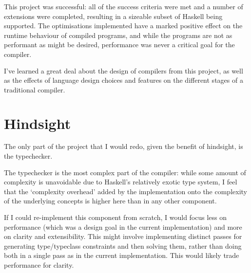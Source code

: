\documentclass[dissertation.tex]{subfiles}
\begin{document}
This project was successful: all of the success criteria were met and a number of extensions were completed, resulting
in a sizeable subset of Haskell being supported. The optimisations implemented have a marked positive
effect on the runtime behaviour of compiled programs, and while the programs are not as performant as might
be desired, performance was never a critical goal for the compiler.

I've learned a great deal about the design of compilers from this project, as well as the effects of language design
choices and features on the different stages of a traditional compiler.

\section{Hindsight}
{

    The only part of the project that I would redo, given the benefit of hindsight, is the typechecker.

    The typechecker is the most complex part of the compiler: while some amount of complexity is unavoidable due to
    Haskell's relatively exotic type system, I feel that the `complexity overhead' added by the implementation onto the
    complexity of the underlying concepts is higher here than in any other component.

    If I could re-implement this component from scratch, I would focus less on performance (which was a design goal in
    the current implementation) and more on clarity and extensibility. This might involve implementing distinct passes
    for generating type/typeclass constraints and then solving them, rather than doing both in a single pass as in the
    current implementation. This would likely trade performance for clarity.

}
\end{document}

